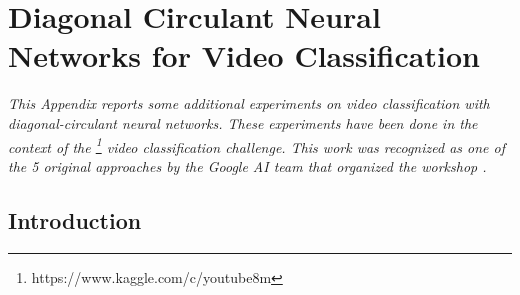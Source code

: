 \chapter{Diagonal Circulant Neural Networks for Video Classification}
\label{appendix:ap2-diagonal_circulant_neural_networks_for_video_classification}
\localtoc

\noindent
\emph{This Appendix reports some additional experiments on video classification with diagonal-circulant neural networks.
These experiments have been done in the context of the \yt\footnote{https://www.kaggle.com/c/youtube8m} video classification challenge.
This work was recognized as one of the 5 original approaches by the Google AI team that organized the workshop \cite{lee20182nd}.}

\vspace{\fill}

\section{Introduction}
\label{section:ap2-introduction}

